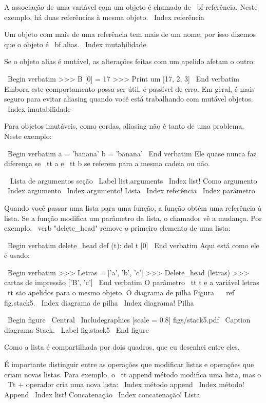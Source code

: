 \documentclass[10pt]{book}
\begin{document}
{{{{{{{A associação de uma variável com um objeto é chamado de {\ bf
referência}. Neste exemplo, há duas referências à mesma
objeto.
\ Index {referência}

Um objeto com mais de uma referência tem mais
de um nome, por isso dizemos que o objeto é {\ bf alias}.
\ Index {} mutabilidade

Se o objeto alias é mutável, as alterações feitas com um apelido afetam
o outro:

\ Begin {verbatim}
>>> B [0] = 17
>>> Print um
[17, 2, 3]
\ End {verbatim}
%
Embora este comportamento possa ser útil, é passível de erro. Em geral,
é mais seguro para evitar aliasing quando você está trabalhando com mutável
objetos.
\ Index {imutabilidade}

Para objetos imutáveis, como cordas, aliasing não é tanto de uma
problema. Neste exemplo:

\ Begin {verbatim}
a = 'banana'
b = 'banana'
\ End {verbatim}
%
Ele quase nunca faz diferença se {\ tt a} e {\ tt b} se referem
para a mesma cadeia ou não.


\ {} Lista de argumentos seção
\ Label {} list.arguments
\ Index {list! Como argumento}
\ Index {argumento}
\ Index {argumento! Lista}
\ Index {referência}
\ Index {parâmetro}

Quando você passar uma lista para uma função, a função obtém uma referência
à lista.
Se a função modifica um parâmetro da lista, o chamador vê a mudança.
Por exemplo, \ verb "delete_head" remove o primeiro elemento de uma lista:

\ Begin {verbatim}
delete_head def (t):
    del t [0]
\ End {verbatim}
%
Aqui está como ele é usado:

\ Begin {verbatim}
>>> Letras = ['a', 'b', 'c']
>>> Delete_head (letras)
>>> cartas de impressão
['B', 'c']
\ End {verbatim}
%
O parâmetro {\ tt t} e {a variável letras \ tt} são
apelidos para o mesmo objeto. O diagrama de pilha
Figura ~ \ ref {} fig.stack5.
\ Index {diagrama de pilha}
\ Index {diagrama! Pilha}

\ Begin {figure}
\ Central
{\ Includegraphics [scale = 0.8] {figs/stack5.pdf}}
\ Caption {diagrama Stack.}
\ Label {} fig.stack5
\ End {figure}


Como a lista é compartilhada por dois quadros, que eu desenhei
entre eles.

É importante distinguir entre as operações que
modificar listas e operações que criam novas listas. Para
exemplo, o {\ tt} append método modifica uma lista, mas o
{\ Tt +} operador cria uma nova lista:
\ Index {método append}
\ Index {método! Append}
\ Index {list! Concatenação}
\ Index {concatenação! Lista}

}}}}}}}
\end{document}
